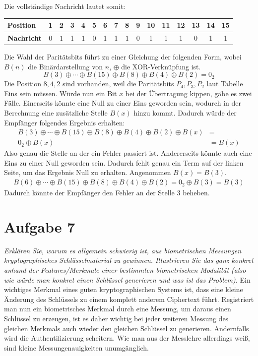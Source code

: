 \documentclass{article}
\begin{document}
    Die vollständige Nachricht lautet somit:
    \begin{center}
        \begin{tabular}{l|ccccccccccccccc}
            \textbf{Position} & 1 & 2 & 3 & 4 &5&6&7&8&9&10&11&12&13&14&15\\\hline
            \textbf{Nachricht} & $0$ & $1$ & 1 & $1$ &0&1&1&$1$& 0 & 1 & 1& 1 &0 & 1 & 1
        \end{tabular}
    \end{center}
    Die Wahl der Paritätsbits führt zu einer Gleichung der folgenden Form, wobei $B(n)$ die Binärdarstellung
    von $n$, $\oplus$ die XOR-Verknüpfung ist.
    \[
        B(3) \oplus \cdots\oplus B(15) \oplus B(8) \oplus B(4) \oplus B(2) = 0_2
    \]
    Die Position $8, 4, 2$ sind vorhanden, weil die Paritätsbits $P_4, P_3, P_2$ laut Tabelle Eins sein müssen.
    Würde nun ein Bit $x$ bei der Übertragung kippen, gäbe es zwei Fälle. Einerseits könnte eine Null zu einer Eins geworden
    sein, wodurch in der Berechnung eine zusätzliche Stelle $B(x)$ hinzu kommt. Dadurch würde der Empfänger folgendes
    Ergebnis erhalten:
    \begin{align*}
        B(3) \oplus \cdots\oplus B(15) \oplus B(8) \oplus B(4) \oplus B(2)\oplus B(x) &=\\
        0_2 \oplus B(x) &= B(x)
    \end{align*}
    Also genau die Stelle an der ein Fehler passiert ist. Andererseits könnte auch eine Eins zu einer Null geworden
    sein. Dadurch fehlt genau ein Term auf der linken Seite, um das Ergebnis Null zu erhalten. Angenommen $B(x) = B(3)$. 
    \begin{align*}
        B(6) \oplus \cdots\oplus B(15) \oplus B(8) \oplus B(4) \oplus B(2) = 0_2 \oplus B(3) = B(3)
    \end{align*}
    Dadurch könnte der Empfänger den Fehler an der Stelle $3$ beheben.
    \section{Aufgabe 7}
    \textit{Erklären Sie, warum es allgemein schwierig ist, aus biometrischen Messungen kryptographisches 
    Schlüsselmaterial zu gewinnen. Illustrieren Sie das ganz konkret anhand der Features/Merkmale
    einer bestimmten biometrischen Modalität (also wie würde man konkret einen Schlüssel
    generieren und was ist das Problem).}\vspace*{1em}\newline
    Ein wichtiges Merkmal eines guten kryptographischen Systems ist, dass eine kleine Änderung des Schlüssels
    zu einem komplett anderem Ciphertext führt. Registriert man nun ein biometrisches Merkmal durch eine Messung, 
    um daraus einen  Schlüssel zu erzeugen, ist es daher wichtig bei jeder weiteren Messung des gleichen Merkmals 
    auch wieder den gleichen Schlüssel zu generieren. Andernfalls wird die Authentifizierung scheitern. Wie man
    aus der Messlehre allerdings weiß, sind kleine Messungenauigkeiten unumgänglich.
\end{document}
